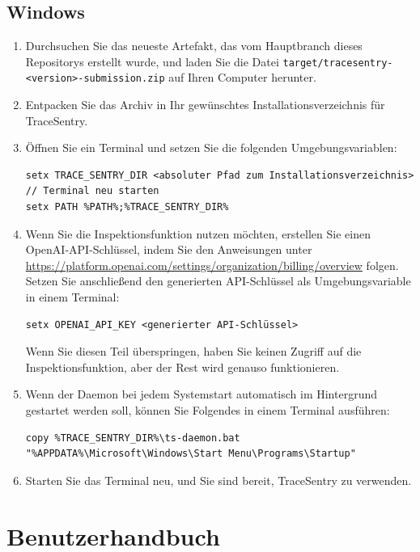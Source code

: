 \documentclass[a4paper,12pt]{report}
\begin{document}
    \subsection{Windows}
    \begin{enumerate}
        \item Durchsuchen Sie das neueste Artefakt, das vom Hauptbranch dieses Repositorys erstellt wurde, und laden Sie die Datei
        \texttt{target/tracesentry-\textless{}version\textgreater{}-submission.zip} auf Ihren Computer herunter.
        \item Entpacken Sie das Archiv in Ihr gewünschtes Installationsverzeichnis für TraceSentry.
        \item Öffnen Sie ein Terminal und setzen Sie die folgenden Umgebungsvariablen:
        \begin{lstlisting}[label={lst:lstlisting-windows-1}]
setx TRACE_SENTRY_DIR <absoluter Pfad zum Installationsverzeichnis>
// Terminal neu starten
setx PATH %PATH%;%TRACE_SENTRY_DIR%
        \end{lstlisting}
        \item Wenn Sie die Inspektionsfunktion nutzen möchten, erstellen Sie einen OpenAI-API-Schlüssel, indem Sie den Anweisungen unter \url{https://platform.openai.com/settings/organization/billing/overview} folgen.
        Setzen Sie anschließend den generierten API-Schlüssel als Umgebungsvariable in einem Terminal:
        \begin{lstlisting}[label={lst:lstlisting-windows-2}]
setx OPENAI_API_KEY <generierter API-Schlüssel>
        \end{lstlisting}
        Wenn Sie diesen Teil überspringen, haben Sie keinen Zugriff auf die Inspektionsfunktion, aber der Rest wird genauso funktionieren.
        \item Wenn der Daemon bei jedem Systemstart automatisch im Hintergrund gestartet werden soll, können Sie Folgendes in einem Terminal ausführen:
        \begin{lstlisting}[label={lst:lstlisting-windows-3}]
copy %TRACE_SENTRY_DIR%\ts-daemon.bat "%APPDATA%\Microsoft\Windows\Start Menu\Programs\Startup"
        \end{lstlisting}
        \item Starten Sie das Terminal neu, und Sie sind bereit, TraceSentry zu verwenden.
    \end{enumerate}


    \section{Benutzerhandbuch}
\end{document}
